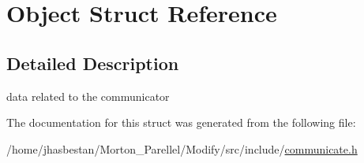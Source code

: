 \hypertarget{structObject}{
\section{Object Struct Reference}
\label{structObject}
}


\subsection{Detailed Description}
data related to the communicator 

The documentation for this struct was generated from the following file:\begin{DoxyCompactItemize}
\item 
/home/jhasbestan/Morton\_\-Parellel/Modify/src/include/\hyperlink{communicate_8h}{communicate.h}\end{DoxyCompactItemize}
